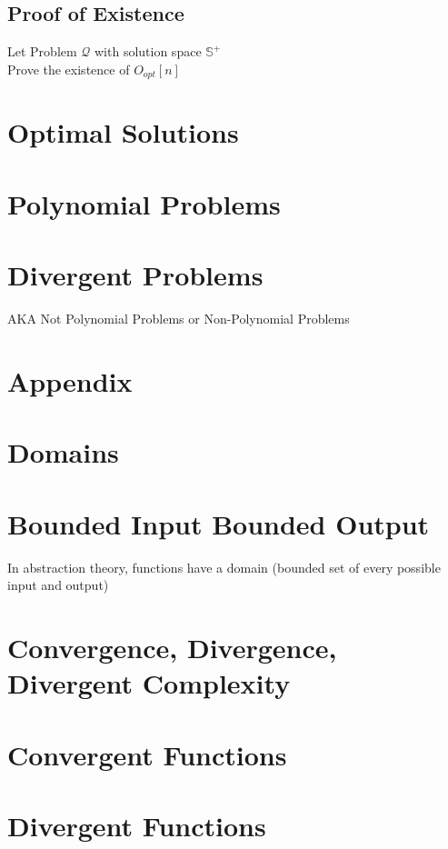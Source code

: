 \documentclass[11pt]{article}
\begin{document}
\subsection{Proof of Existence}
Let Problem $\mathcal{Q}$ with solution space $\mathbb{S}^+$\\
Prove the existence of $O_{opt}[n]$

\section{Optimal Solutions}

\section{Polynomial Problems}

\section{Divergent Problems}
AKA Not Polynomial Problems or Non-Polynomial Problems






\newpage
\section*{Appendix}

\section{Domains}
\section{Bounded Input Bounded Output}
In abstraction theory, functions have a domain (bounded set of every possible input and output)



\section*{Convergence, Divergence, Divergent Complexity}
\section{Convergent Functions}
\section{Divergent Functions}
\end{document}
